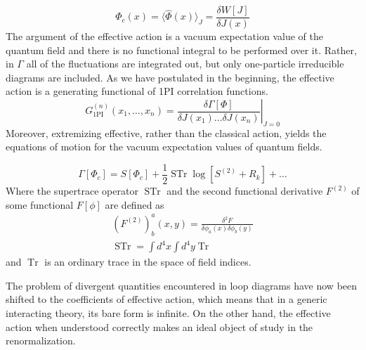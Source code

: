 \documentclass[11pt, a4paper]{article}
\begin{document}
\begin{equation}
    \Phi_c(x) = \langle \hat\Phi (x) \rangle_{J} = \frac{\delta W[J]}{\delta J(x)}
\end{equation}
The argument of the effective action is a vacuum expectation value of the quantum field and there is no functional integral to be performed over it.
Rather, in $\Gamma$ all of the fluctuations are integrated out, but only one-particle irreducible diagrams
are included. 
As we have postulated in the beginning, the effective action is a generating functional of 1PI correlation functions.
\begin{equation}
    G_{\text{1PI}}^{(n)}(x_1,\dots,x_n) = \left.\frac{\delta \Gamma[\Phi]}{\delta J(x_1) \dots \delta J(x_n)}\right|_{J=0}
\end{equation}
Moreover, extremizing effective, rather than the classical action, yields the equations of motion for the vacuum expectation values of quantum fields.

\begin{equation}
    \Gamma[\Phi_c] = S[\Phi_c] + \frac{1}{2} \operatorname{STr} \operatorname{log} \left[ S^{(2)} + R_k \right] + \dots
\end{equation}
Where the supertrace operator $ \operatorname{STr}$ and the second functional derivative $F^{(2)}$ of some functional $F[\phi]$ are defined as
\begin{gather}
    (F^{(2)})^a_b(x,y) = \frac{\delta^2 F}{\delta\phi_a(x)\delta\phi_b(y)}\\
    \operatorname{STr} = \int d^4 x \int d^4 y \operatorname{Tr}
\end{gather}
and $\operatorname{Tr}$ is an ordinary trace in the space of field indices.


The problem of divergent quantities encountered in loop diagrams have now been shifted to the coefficients of effective action, which means that in a generic interacting theory, its bare form is infinite. On the other hand, the effective action when understood correctly makes an ideal object of study in the renormalization.




\end{document}
